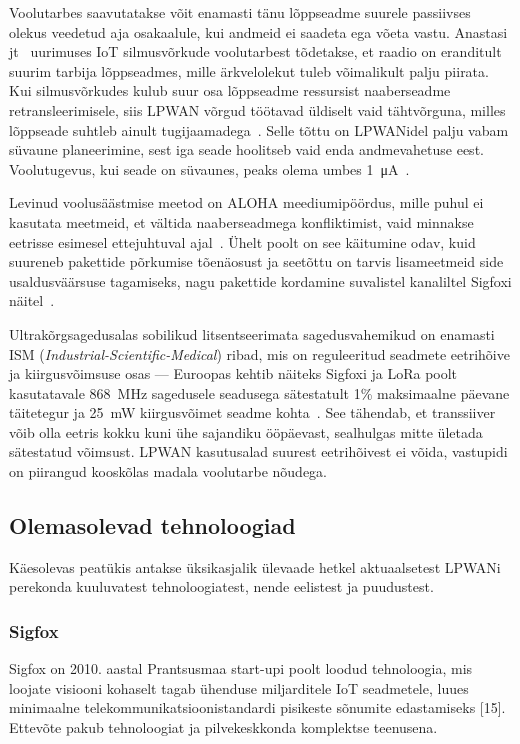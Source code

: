 \documentclass[12pt]{article}
\begin{document}
Voolutarbes saavutatakse võit enamasti tänu lõppseadme suurele passiivses olekus veedetud aja osakaalule, kui andmeid ei saadeta ega võeta vastu.
Anastasi jt~\cite{anastasi} uurimuses IoT silmusvõrkude voolutarbest tõdetakse, et raadio on eranditult suurim tarbija lõppseadmes, mille ärkvelolekut tuleb võimalikult palju piirata.
Kui silmusvõrkudes kulub suur osa lõppseadme ressursist naaberseadme retransleerimisele, siis LPWAN võrgud töötavad üldiselt vaid tähtvõrguna,  milles lõppseade suhtleb ainult tugijaamadega~\cite{centenaro}.
Selle tõttu on LPWANidel palju vabam süvaune planeerimine, sest iga seade hoolitseb vaid enda andmevahetuse eest. Voolutugevus, kui seade on süvaunes, peaks olema umbes \SI{1}{\micro\ampere}~\cite{goursaud}.

Levinud voolusäästmise meetod on ALOHA meediumipöördus, mille puhul ei kasutata meetmeid, et vältida naaberseadmega konfliktimist, vaid minnakse eetrisse esimesel ettejuhtuval ajal~\cite{raza}.
Ühelt poolt on see käitumine odav, kuid suureneb pakettide põrkumise tõenäosust ja seetõttu on tarvis lisameetmeid side usaldusväärsuse tagamiseks, nagu pakettide kordamine suvalistel kanaliltel Sigfoxi näitel~\cite{raza}.

Ultrakõrgsagedusalas sobilikud litsentseerimata sagedusvahemikud on enamasti ISM (\textit{Industrial-Scientific-Medical}) ribad, mis on reguleeritud seadmete eetrihõive ja kiirgusvõimsuse osas — Euroopas kehtib näiteks Sigfoxi ja LoRa poolt kasutatavale \SI{868}{\mega\hertz} sagedusele seadusega sätestatult 1\% maksimaalne päevane täitetegur ja \SI{25}{\milli\watt} kiirgusvõimet seadme kohta~\cite{etsi}.
See tähendab, et transsiiver võib olla eetris kokku kuni ühe sajandiku ööpäevast, sealhulgas mitte ületada sätestatud võimsust.
LPWAN kasutusalad suurest eetrihõivest ei võida, vastupidi on piirangud kooskõlas madala voolutarbe nõudega.

\subsection{Olemasolevad tehnoloogiad}

Käesolevas peatükis antakse üksikasjalik ülevaade hetkel aktuaalsetest LPWANi perekonda kuuluvatest tehnoloogiatest, nende eelistest ja puudustest.

\subsubsection{Sigfox}

Sigfox on 2010. aastal Prantsusmaa start-upi poolt loodud tehnoloogia, mis loojate visiooni kohaselt tagab ühenduse miljarditele IoT seadmetele, luues minimaalne telekommunikatsioonistandardi pisikeste sõnumite edastamiseks [15].
Ettevõte pakub tehnoloogiat ja pilvekeskkonda komplektse teenusena.
\end{document}
